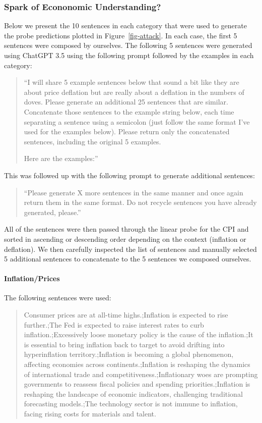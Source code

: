 \subsubsection{Spark of Econonomic Understanding?}\label{appendix:sentences}

Below we present the 10 sentences in each category that were used to generate the probe predictions plotted in Figure~\ref{fig-attack}. In each case, the first 5 sentences were composed by ourselves. The following 5 sentences were generated using ChatGPT 3.5 using the following prompt followed by the examples in each category:

\begin{quote}
  ``I will share 5 example sentences below that sound a bit like they are about price deflation but are really about a deflation in the numbers of doves. Please generate an additional 25 sentences that are similar. Concatenate those sentences to the example string below, each time separating a sentence using a semicolon (just follow the same format I've used for the examples below). Please return only the concatenated sentences, including the original 5 examples. 

  Here are the examples:''
\end{quote}

This was followed up with the following prompt to generate additional sentences:

\begin{quote}
  ``Please generate X more sentences in the same manner and once again return them in the same format. Do not recycle sentences you have already generated, please.''
\end{quote}

All of the sentences were then passed through the linear probe for the CPI and sorted in ascending or descending order depending on the context (inflation or deflation). We then carefully inspected the list of sentences and manually selected 5 additional sentences to concatenate to the 5 sentences we composed ourselves.

\paragraph{Inflation/Prices}

The following sentences were used:

\begin{quote}
  Consumer prices are at all-time highs.;Inflation is expected to rise further.;The Fed is expected to raise interest rates to curb inflation.;Excessively loose monetary policy is the cause of the inflation.;It is essential to bring inflation back to target to avoid drifting into hyperinflation territory.;Inflation is becoming a global phenomenon, affecting economies across continents.;Inflation is reshaping the dynamics of international trade and competitiveness.;Inflationary woes are prompting governments to reassess fiscal policies and spending priorities.;Inflation is reshaping the landscape of economic indicators, challenging traditional forecasting models.;The technology sector is not immune to inflation, facing rising costs for materials and talent.
\end{quote}

